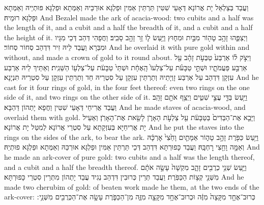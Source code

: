 {{}
{וַעֲבַד בְּצַלְאֵל יָת אֲרוֹנָא דְּאָעֵי שִׁטִּין תַּרְתֵּין אַמִּין וּפַלְגָּא אוּרְכֵּיהּ וְאַמְּתָא וּפַלְגָּא פּוּתְיֵיהּ וְאַמְּתָא וּפַלְגָּא רוּמֵיהּ׃}
{And Bezalel made the ark of acacia-wood: two cubits and a half was the length of it, and a cubit and a half the breadth of it, and a cubit and a half the height of it.}{}
{וַיְצַפֵּ֛הוּ זָהָ֥ב טָה֖וֹר מִבַּ֣יִת וּמִח֑וּץ וַיַּ֥עַשׂ ל֛וֹ זֵ֥ר זָהָ֖ב סָבִֽיב׃}
{וַחֲפָהִי דְּהַב דְּכֵי מִגָּיו וּמִבַּרָא וַעֲבַד לֵיהּ זִיר דִּדְהַב סְחוֹר סְחוֹר׃}
{And he overlaid it with pure gold within and without, and made a crown of gold to it round about.}{}
{וַיִּצֹ֣ק ל֗וֹ אַרְבַּע֙ טַבְּעֹ֣ת זָהָ֔ב עַ֖ל אַרְבַּ֣ע פַּעֲמֹתָ֑יו וּשְׁתֵּ֣י טַבָּעֹ֗ת עַל־צַלְעוֹ֙ הָֽאֶחָ֔ת וּשְׁתֵּי֙ טַבָּעֹ֔ת עַל־צַלְע֖וֹ הַשֵּׁנִֽית׃}
{וְאַתֵּיךְ לֵיהּ אַרְבַּע עִזְקָן דִּדְהַב עַל אַרְבַּע זָוְיָתֵיהּ וְתַרְתֵּין עִזְקָן עַל סִטְרֵיהּ חַד וְתַרְתֵּין עִזְקָן עַל סִטְרֵיהּ תִּנְיָנָא׃}
{And he cast for it four rings of gold, in the four feet thereof: even two rings on the one side of it, and two rings on the other side of it.}{}
{וַיַּ֥עַשׂ בַּדֵּ֖י עֲצֵ֣י שִׁטִּ֑ים וַיְצַ֥ף אֹתָ֖ם זָהָֽב׃}
{וַעֲבַד אֲרִיחֵי דְּאָעֵי שִׁטִּין וַחֲפָא יָתְהוֹן דַּהְבָּא׃}
{And he made staves of acacia-wood, and overlaid them with gold.}{}
{וַיָּבֵ֤א אֶת־הַבַּדִּים֙ בַּטַּבָּעֹ֔ת עַ֖ל צַלְעֹ֣ת הָאָרֹ֑ן לָשֵׂ֖את אֶת־הָאָרֹֽן׃}
{וְאַעֵיל יָת אֲרִיחַיָּא בְּעִזְקָתָא עַל סִטְרֵי אֲרוֹנָא לְמִטַּל יָת אֲרוֹנָא׃}
{And he put the staves into the rings on the sides of the ark, to bear the ark.}{}
{וַיַּ֥עַשׂ כַּפֹּ֖רֶת זָהָ֣ב טָה֑וֹר אַמָּתַ֤יִם וָחֵ֙צִי֙ אׇרְכָּ֔הּ וְאַמָּ֥ה וָחֵ֖צִי רׇחְבָּֽהּ׃}
{וַעֲבַד כָּפוּרְתָּא דִּדְהַב דְּכֵי תַּרְתֵּין אַמִּין וּפַלְגָּא אוּרְכַּהּ וְאַמְּתָא וּפַלְגָּא פוּתְיַהּ׃}
{And he made an ark-cover of pure gold: two cubits and a half was the length thereof, and a cubit and a half the breadth thereof.}{}
{וַיַּ֛עַשׂ שְׁנֵ֥י כְרֻבִ֖ים זָהָ֑ב מִקְשָׁה֙ עָשָׂ֣ה אֹתָ֔ם מִשְּׁנֵ֖י קְצ֥וֹת הַכַּפֹּֽרֶת׃}
{וַעֲבַד תְּרֵין כְּרוּבִין דִּדְהַב נְגִיד עֲבַד יָתְהוֹן מִתְּרֵין סִטְרֵי כָּפוּרְתָּא׃}
{And he made two cherubim of gold: of beaten work made he them, at the two ends of the ark-cover:}{}
{כְּרוּב־אֶחָ֤ד מִקָּצָה֙ מִזֶּ֔ה וּכְרוּב־אֶחָ֥ד מִקָּצָ֖ה מִזֶּ֑ה מִן־הַכַּפֹּ֛רֶת עָשָׂ֥ה אֶת־הַכְּרֻבִ֖ים מִשְּׁנֵ֥י ׃}
}
